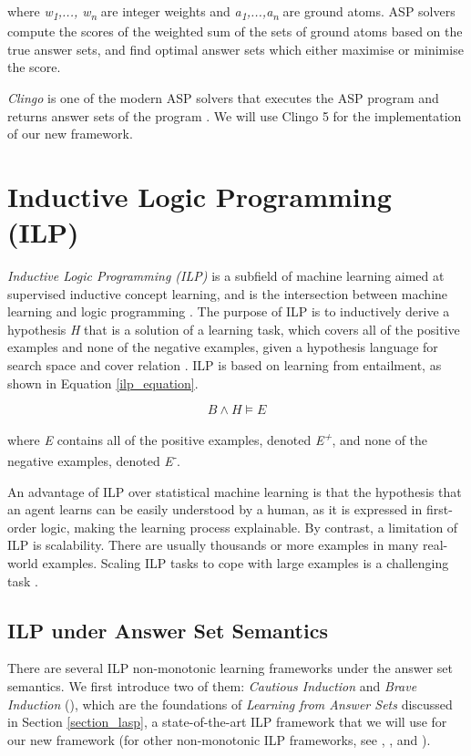 \documentclass[11pt,twoside]{report}
\theoremstyle{plain}
\theoremstyle{definition}
\begin{document}
where \textit{w\textsubscript{1},..., w\textsubscript{n}} are integer weights and \textit{a\textsubscript{1},...,a\textsubscript{n}} are ground atoms.  ASP solvers compute the scores of the weighted sum of the sets of ground atoms based on the true answer sets, and find optimal answer sets which either maximise or minimise the score.

\textit{Clingo} is one of the modern ASP solvers that executes the ASP program and returns answer sets of the program \cite{Gebser2011}. We will use Clingo 5 for the implementation of our new framework.


\section{Inductive Logic Programming (ILP)}
\label{sec:ilp}

\textit{Inductive Logic Programming (ILP)} is a subfield of machine learning aimed at supervised inductive concept learning, and is the intersection between machine learning and logic programming \cite{Muggleton1991}. 
The purpose of ILP is to inductively derive a hypothesis \textit{H} that is a solution of a learning task, which covers all of the positive examples and none of the negative examples, given a hypothesis language for search space and cover relation \cite{DeRaedt1997}. 
ILP is based on learning from entailment, as shown in Equation \ref{ilp_equation}.

\begin{equation}\label{ilp_equation}
B \wedge H \models E
\end{equation}

where \textit{E} contains all of the positive examples, denoted \textit{E\textsuperscript{+}}, and none of the negative examples, denoted \textit{E\textsuperscript{-}}.

An advantage of ILP over statistical machine learning is that the hypothesis that an agent learns can be easily understood by a human, as it is expressed in first-order logic, making the learning process explainable.
By contrast, a limitation of ILP is scalability. There are usually thousands or more examples in many real-world examples. Scaling ILP tasks to cope with large examples is a challenging task \cite{Muggleton1993}.

\subsection{ILP under Answer Set Semantics}
There are several ILP non-monotonic learning frameworks under the answer set semantics. 
We first introduce two of them: \textit{Cautious Induction} and \textit{Brave Induction} (\cite{Sakama2009}), 
which are the foundations of \textit{Learning from Answer Sets} discussed in Section \ref{section_lasp}, a state-of-the-art ILP framework that we will use for our new framework (for other non-monotonic ILP frameworks, see \cite{Otero2001}, \cite{Inoue2014}, \cite{Corapi2012} and \cite{DeRaedt1997}).
\end{document}
